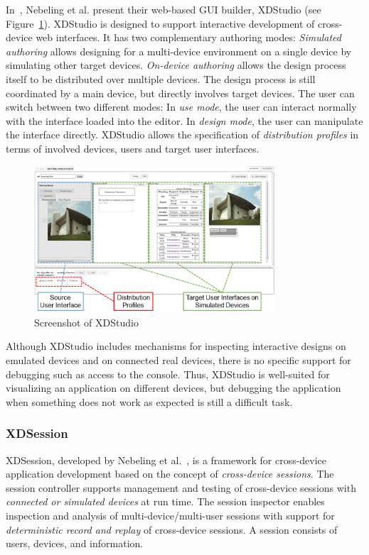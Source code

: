 In~\cite{xdstudio2014}, Nebeling et al. present their web-based GUI builder, XDStudio (see Figure~\ref{fig:xdstudio}). XDStudio is designed to support interactive development of cross-device web interfaces. It has two complementary authoring modes: \emph{Simulated authoring} allows designing for a multi-device environment on a single device by simulating other target devices. \emph{On-device authoring} allows the design process itself to be distributed over multiple devices. The design process is still coordinated by a main device, but directly involves target devices. The user can switch between two different modes: In \emph{use mode}, the user can interact normally with the interface loaded into the editor. In \emph{design mode}, the user can manipulate the interface directly. XDStudio allows the specification of \emph{distribution profiles} in terms of involved devices, users and target user interfaces.

\begin{figure}[H]
  \centering
    \includegraphics[width=0.8\textwidth]{images/relatedwork/xdstudio.png}
	\caption[Screenshot: XDStudio]{Screenshot of XDStudio}
	\label{fig:xdstudio}
\end{figure}

Although XDStudio includes mechanisms for inspecting interactive designs on emulated devices and on connected real devices, there is no specific support for debugging such as access to the console. Thus, XDStudio is well-suited for visualizing an application on different devices, but debugging the application when something does not work as expected is still a difficult task.

\subsubsection{XDSession}

XDSession, developed by Nebeling et al.~\cite{xdsession2015}, is a framework for cross-device application development based on the concept of \emph{cross-device sessions}. The session controller supports management and testing of cross-device sessions with \emph{connected or simulated devices} at run time. The session inspector enables inspection and analysis of multi-device/multi-user sessions with support for \emph{deterministic record and replay} of cross-device sessions. A session consists of users, devices, and information.

